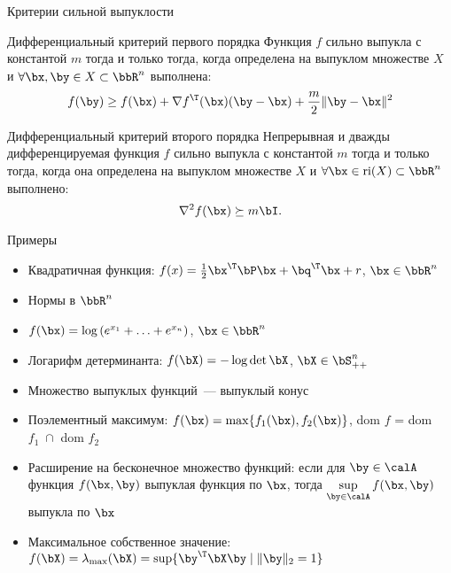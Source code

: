 \documentclass[12pt,russian]{beamer}
\begin{document}
\begin{frame}{Критерии сильной выпуклости}

\begin{block}{Дифференциальный критерий первого порядка}
Функция $f$ сильно выпукла с константой $m$ тогда и только тогда, когда определена на выпуклом множестве $X$ и $\forall \bx, \by \in X \subset \bbR^n$ выполнена:
\vspace{-4mm}
\[
f(\by) \geq f(\bx) + \nabla f^{\T}(\bx)(\by - \bx) + \frac{m}{2}\| \by - \bx \|^2
\]
\end{block}

\begin{block}{Дифференциальный критерий второго порядка}
Непрерывная и дважды дифференцируемая функция $f$ сильно выпукла с константой $m$ тогда и только тогда, когда она определена на выпуклом множестве $X$ и $\forall \bx \in \text{ri}(X) \subset \bbR^n$ выполнено:
\vspace{-2mm}
\[
\nabla^2 f(\bx) \succeq m\bI.
\]
\end{block}
\end{frame}

\begin{frame}{Примеры}
\begin{itemize}
\item Квадратичная функция: $f(x) = \frac{1}{2}\bx^{\T}\bP\bx + \bq^{\T}\bx + r$, $\bx \in \bbR^n$
\item Нормы в $\bbR^n$
\item $f(\bx) = \log{(e^{x_1} + \ldots + e^{x_n})}$, $\bx \in \bbR^n$
\item Логарифм детерминанта: $f(\bX) = -\log{\det{\bX}}$, $\bX \in \bS^n_{++}$
\item Множество выпуклых функций~--- выпуклый конус
\item Поэлементный максимум: $f(\bx) = \max\{f_1(\bx), f_2(\bx)\}$, dom $f$ = dom $f_1 \; \cap $ dom $f_2$
\item Расширение на бесконечное множество функций: если для $\by \in \calA$ функция $f(\bx, \by)$ выпуклая функция по $\bx$, тогда $\sup\limits_{\by \in \calA} f(\bx, \by) $ выпукла по $\bx$
\item Максимальное собственное значение: $f(\bX) = \lambda_{\max}(\bX) = \sup\{\by^{\T}\bX\by \; | \; \|\by\|_2 = 1\}$ 

\end{itemize}
\end{frame}
\end{document}
